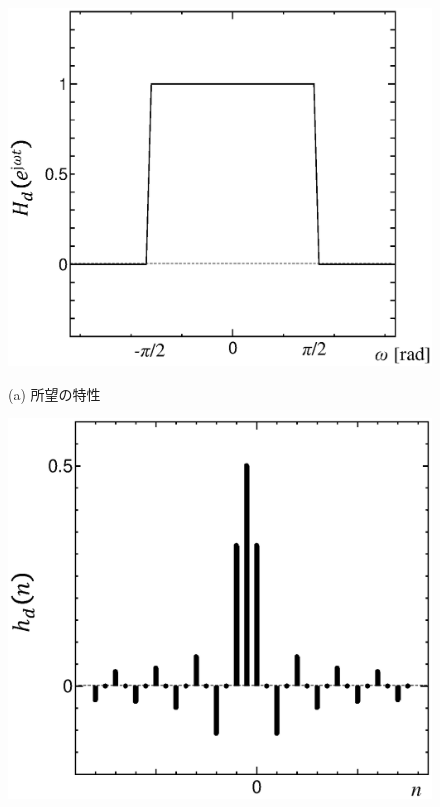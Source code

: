 \begin{figure}[H]
\begin{center}
\begin{minipage}{.4\textwidth}
\begin{center}
\includegraphics[width=.98\textwidth]{fig/zu-6-12-a.eps}

(a) 所望の特性
\end{center}
\end{minipage}
\begin{minipage}{.38\textwidth}
\begin{center}
\includegraphics[width=.98\textwidth]{fig/zu-6-12-b.eps}


\end{center}
\end{minipage}
\end{center}
\end{figure}
